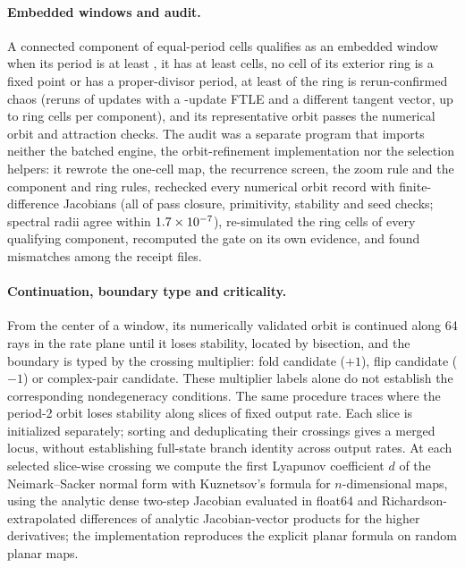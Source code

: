 \documentclass[11pt,letterpaper]{article}
\begin{document}
\paragraph{Embedded windows and audit.} A connected component of equal-period cells qualifies as an embedded
window when its period is at least \nGateMinPeriod{}, it has at least \nMinComponent{} cells, no cell of its
exterior ring is a fixed point or has a proper-divisor period, at least \pRingFraction{} of the ring is
rerun-confirmed chaos (reruns of \nRingSteps{} updates with a \nRingFtle{}-update FTLE and a different tangent
vector, up to \nRingCap{} ring cells per component), and its representative orbit passes the numerical orbit and attraction checks.
The audit was a separate program that imports neither the batched engine, the orbit-refinement implementation nor the selection
helpers: it rewrote the one-cell map, the recurrence screen, the zoom rule and the component and ring rules,
rechecked every numerical orbit record with finite-difference Jacobians (all \nAuditAllOk{} of \nAuditChecked{} pass closure,
primitivity, stability and seed checks; spectral radii agree within $1.7\times10^{-7}$), re-simulated the
ring cells of every qualifying component, recomputed the gate on its own evidence, and found \nAuditMismatched{}
mismatches among the \nAuditReceiptFiles{} receipt files.

\paragraph{Continuation, boundary type and criticality.} From the center of a window, its numerically validated orbit is
continued along 64 rays in the rate plane until it loses stability, located by bisection, and the boundary is
typed by the crossing multiplier: fold candidate ($+1$), flip candidate ($-1$) or complex-pair candidate.
These multiplier labels alone do not establish the corresponding nondegeneracy conditions. The same procedure traces where the
period-2 orbit loses stability along slices of fixed output rate. Each slice is initialized separately; sorting
and deduplicating their crossings gives a merged locus, without establishing full-state branch identity across
output rates. At each selected slice-wise crossing we compute the first Lyapunov coefficient $d$ of the Neimark--Sacker normal form with
Kuznetsov's formula for $n$-dimensional maps, using the analytic dense two-step Jacobian evaluated in float64 and Richardson-extrapolated
differences of analytic Jacobian-vector products for the higher derivatives; the implementation reproduces the
explicit planar formula on random planar maps.
\end{document}
